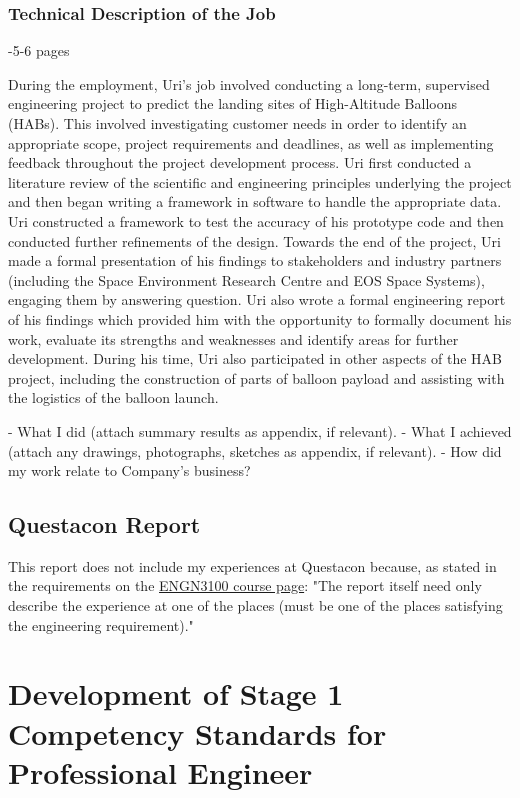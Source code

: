 \documentclass[11pt]{article}
\begin{document}
\subsubsection{Technical Description of the Job}
-5-6 pages

During the employment, Uri’s job involved conducting a long-term, supervised engineering project to predict the landing sites of High-Altitude Balloons (HABs). This involved investigating customer needs in order to identify an appropriate scope, project requirements and deadlines, as well as implementing feedback throughout the project development process. Uri first conducted a literature review of the scientific and engineering principles underlying the project and then began writing a framework in software to handle the appropriate data. Uri constructed a framework to test the accuracy of his prototype code and then conducted further refinements of the design. Towards the end of the project, Uri made a formal presentation of his findings to stakeholders and industry partners (including the Space Environment Research Centre and EOS Space Systems), engaging them by answering question. Uri also wrote a formal engineering report of his findings which provided him with the opportunity to formally document his work, evaluate its strengths and weaknesses and identify areas for further development. During his time, Uri also participated in other aspects of the HAB project, including the construction of parts of balloon payload and assisting with the logistics of the balloon launch. 

- What I did (attach summary results as appendix, if relevant).
- What I achieved (attach any drawings, photographs, sketches as appendix, if
relevant).
- How did my work relate to Company's business?

\subsection{Questacon Report}

This report does not include my experiences at Questacon because, as stated in the requirements on the \href{http://programsandcourses.anu.edu.au/course/engn3100}{ENGN3100 course page}: "The report itself need only describe the experience at one of the places (must be one of the places satisfying the engineering requirement)."

\newpage

\section{Development of Stage 1 Competency Standards for Professional Engineer}
\end{document}
